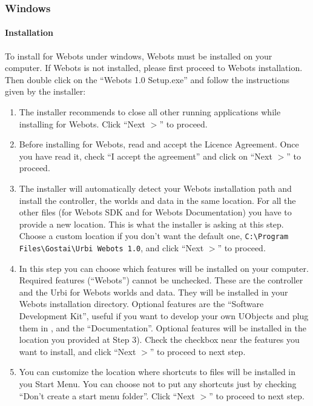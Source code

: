 \subsubsection{Windows}

\paragraph{Installation}

To install \urbi for Webots under windows, Webots must be installed on
your computer. If Webots is not installed, please first proceed to
Webots installation. Then double click on the ``\urbi Webots 1.0
Setup.exe'' and follow the instructions given by the installer:

\begin{enumerate}
\item The installer recommends to close all other running applications
  while installing \urbi for Webots. Click ``Next $>$'' to proceed.

\item Before installing \urbi for Webots, read and accept the Licence
  Agreement. Once you have read it, check ``I accept the agreement'' and
  click on ``Next $>$'' to proceed.

\item The installer will automatically detect your Webots installation
  path and install the \urbi controller, the worlds and data in the
  same location. For all the other files (\urbi for Webots SDK and
  \urbi for Webots Documentation) you have to provide a new
  location. This is what the installer is asking at this step. Choose
  a custom location if you don't want the default one,
  \verb+C:\Program Files\Gostai\Urbi Webots 1.0+, and click
  ``Next $>$'' to proceed.

\item In this step you can choose which features will be installed on
  your computer. Required features (``\urbi Webots'') cannot be
  unchecked. These are the \urbi controller and the Urbi for Webots
  worlds and data. They will be installed in your Webots installation
  directory. Optional features are the ``\urbi Software Development
  Kit'', useful if you want to develop your own UObjects and plug them
  in \urbi, and the ``\urbi Documentation''. Optional features will be
  installed in the location you provided at Step 3).  Check the
  checkbox near the features you want to install, and click ``Next $>$''
  to proceed to next step.

\item You can customize the location where shortcuts to \urbi files
  will be installed in you Start Menu. You can choose not to put any
  shortcuts just by checking ``Don't create a start menu folder''. Click
  ``Next $>$'' to proceed to next step.


\end{enumerate}
